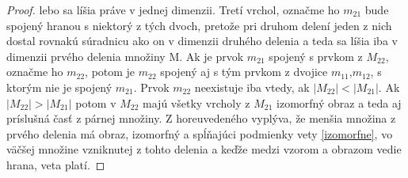\begin{proof}
lebo sa líšia práve v jednej dimenzii. Tretí vrchol, označme ho $m_{21}$
 bude spojený hranou s
niektorý z tých dvoch, pretože pri druhom delení jeden z nich dostal rovnakú
súradnicu ako on v dimenzii druhého delenia a teda sa líšia iba v dimenzii
prvého delenia množiny M. Ak je prvok $m_{21}$ spojený s prvkom z
$M_{22}$, označme ho $m_{22}$, potom je $m_{22}$ spojený aj s tým prvkom
z dvojice $m_{11}$,$m_{12}$, s ktorým nie je spojený $m_{21}$.
Prvok $m_{22}$ neexistuje iba vtedy, ak $|M_{22}|<|M_{21}|$. 
Ak $|M_{22}|>|M_{21}|$ potom v $M_{22}$ majú všetky vrcholy z $M_{21}$
izomorfný obraz a teda aj príslušná časť z párnej množiny.
Z horeuvedeného vyplýva, že menšia množina z prvého delenia má obraz,
izomorfný a spĺňajúci podmienky vety \ref{izomorfne}, 
vo väčšej množine vzniknutej z tohto delenia a keďže 
medzi vzorom a obrazom vedie hrana, veta platí.
\end{proof}

